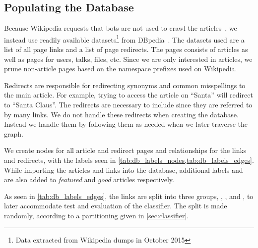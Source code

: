 \subsection{Populating the Database}\label{sec:db_populate}
Because Wikipedia requests that bots are not used to crawl the articles~\cite{wiki-bots}, we instead use readily available datasets\footnote{Data extracted from Wikipedia dumps in October 2015} from DBpedia~\cite{dbpedia}. The datasets used are a list of all page links and a list of page redirects. The pages consists of articles as well as pages for users, talks, files, etc. Since we are only interested in articles, we prune non-article pages based on the namespace prefixes used on Wikipedia.

Redirects are responsible for redirecting synonyms and common misspellings to the main article. For example, trying to access the article on ``Santa'' will redirect to ``Santa Claus''. The redirects are necessary to include since they are referred to by many links. We do not handle these redirects when creating the database. Instead we handle them by following them as needed when we later traverse the graph.


We create nodes for all article and redirect pages and relationships for the links and redirects, with the labels seen in \cref{tab:db_labels_nodes,tab:db_labels_edges}. While importing the articles and links into the database, additional labels  and  are also added to  \emph{featured} and \emph{good} articles respectively.

As seen in \cref{tab:db_labels_edges}, the links are split into three groups, , , and , to later accommodate test and evaluation of the classifier. The split is made randomly, according to a partitioning given in \cref{sec:classifier}.

